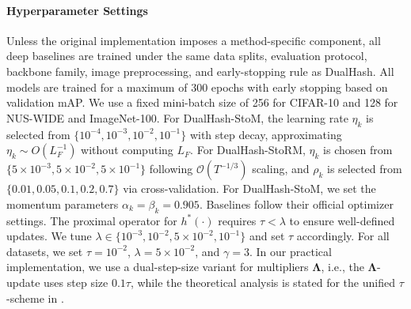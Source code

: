 \paragraph{Hyperparameter Settings} 
{Unless the original implementation imposes a method-specific component, all deep baselines are trained under the same data splits, evaluation protocol, backbone family, image preprocessing, and early-stopping rule as DualHash.} All models are trained for a maximum of 300 epochs with early stopping based on validation mAP. We use a fixed mini-batch size of 256 for CIFAR-10 and 128 for NUS-WIDE and ImageNet-100.
For DualHash-StoM, the learning rate $\eta_k$ is selected from $\{10^{-4}, 10^{-3}, 10^{-2}, 10^{-1}\}$ with step decay, approximating $\eta_k \sim O(L_F^{-1})$ without computing $L_F$. For DualHash-StoRM, $\eta_k$ is chosen from $\{5 \times 10^{-3}, 5 \times 10^{-2}, 5 \times 10^{-1}\}$ following $\mathcal{O}(T^{-1/3})$ scaling, and $\rho_k$ is selected from $\{0.01, 0.05, 0.1, 0.2, 0.7\}$ via cross-validation. For DualHash-StoM, we set the momentum parameters $\alpha_k = \beta_k = 0.905$. Baselines follow their official optimizer settings. The proximal operator for $h^*(\cdot)$ requires $\tau < \lambda$ to ensure well-defined updates. We tune $\lambda \in \{10^{-3}, 10^{-2}, 5\times 10^{-2}, 10^{-1}\}$ and set $\tau$ accordingly. For all datasets, we set $\tau = 10^{-2}$, $\lambda = 5 \times 10^{-2}$, and $\gamma = 3$. In our practical implementation, we use a dual-step-size variant for multipliers \(\bm{\Lambda}\), i.e., the \(\bm{\Lambda}\)-update uses step size \(0.1\tau\), while the theoretical analysis is stated for the unified \(\tau\)-scheme in . 
